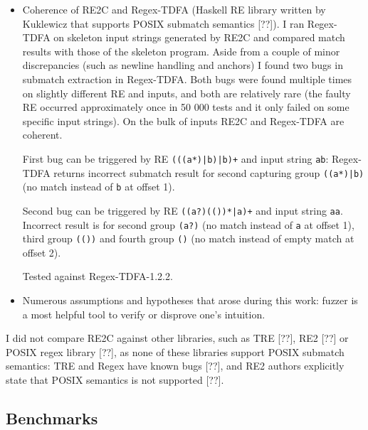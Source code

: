 \documentclass{article}
\theoremstyle{definition}
\begin{document}
\begin{multicols}{2}
\begin{itemize}
    \item Coherence of RE2C and Regex-TDFA (Haskell RE library written by Kuklewicz that supports POSIX submatch semantics [??]).
        I ran Regex-TDFA on skeleton input strings generated by RE2C and compared match results with those of the skeleton program.
        Aside from a couple of minor discrepancies (such as newline handling and anchors)
        I found two bugs in submatch extraction in Regex-TDFA.
        Both bugs were found multiple times on slightly different RE and inputs,
        and both are relatively rare (the faulty RE occurred approximately once in 50 000 tests
        and it only failed on some specific input strings).
        On the bulk of inputs RE2C and Regex-TDFA are coherent.

        First bug can be triggered by RE \texttt{(((a*)|b)|b)+} and input string \texttt{ab}:
        Regex-TDFA returns incorrect submatch result for second capturing group \texttt{((a*)|b)}
        (no match instead of \texttt{b} at offset 1).

        Second bug can be triggered by RE \texttt{((a?)(())*|a)+} and input string \texttt{aa}.
        Incorrect result is for second group \texttt{(a?)} (no match instead of \texttt{a} at offset 1),
        third group \texttt{(())} and fourth group \texttt{()} (no match instead of empty match at offset 2).

        Tested against Regex-TDFA-1.2.2.

    \item Numerous assumptions and hypotheses that arose during this work:
        fuzzer is a most helpful tool to verify or disprove one's intuition.
    \\
\end{itemize}

I did not compare RE2C against other libraries, such as TRE [??], RE2 [??] or POSIX regex library [??],
as none of these libraries support POSIX submatch semantics:
TRE and Regex have known bugs [??],
and RE2 authors explicitly state that POSIX semantics is not supported [??].

\subsection*{Benchmarks}


\end{multicols}
\end{document}

